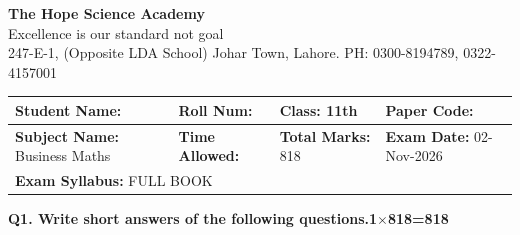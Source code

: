 \documentclass[11pt,a4paper]{article}
\begin{document}
\begin{center}
  {\Huge\bfseries The Hope Science Academy}\\[3pt]
  {\small Excellence is our standard not goal}\\[2pt]
  {\small 247-E-1, (Opposite LDA School) Johar Town, Lahore. PH: 0300-8194789, 0322-4157001}
\end{center}
\medskip\noindent
\begin{tabularx}{\linewidth}{|X|X|X|X|}
\hline
\textbf{Student Name:} & \textbf{Roll Num:} & \textbf{Class:} 11th & \textbf{Paper Code:} \\ \hline
\textbf{Subject Name:} Business Maths & \textbf{Time Allowed:} & \textbf{Total Marks:} 818 & \textbf{Exam Date:} 02-Nov-2026 \\ \hline
\multicolumn{4}{|l|}{\textbf{Exam Syllabus:} FULL BOOK} \\ \hline
\end{tabularx}
\bigskip
\noindent\textbf{Q1. Write short answers of the following questions.}\hfill\textbf{1$\times$818=818}
\end{document}

